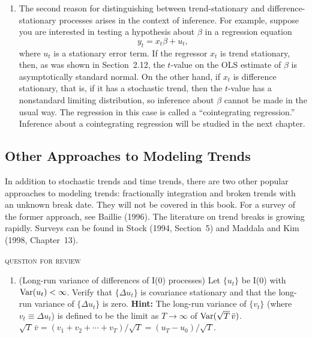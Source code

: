 \begin{enumerate}
\item The second reason for distinguishing between trend-stationary and difference-stationary processes arises in the context of inference. For example, suppose
you are interested in testing a hypothesis about $\beta$ in a regression equation
\begin{equation}
\label{eq:9.1.14}
y_t = x_t \beta + u_t,
\end{equation}
where $u_t$ is a stationary error term. If the regressor $x_t$ is trend stationary, then,
as was shown in Section~2.12, the $t$-value on the OLS estimate of $\beta$ is asymptotically standard normal. On the other hand, if $x_t$ is difference stationary, that
is, if it has a stochastic trend, then the $t$-value has a nonstandard limiting distribution, so inference about $\beta$ cannot be made in the usual way. The regression in
this case is called a ``cointegrating regression.'' Inference about a cointegrating
regression will be studied in the next chapter.
\end{enumerate}

\subsection*{Other Approaches to Modeling Trends}

In addition to stochastic trends and time trends, there are two other popular
approaches to modeling trends: fractionally integration and broken trends with
an unknown break date. They will not be covered in this book. For a survey of
the former approach, see Baillie (1996). The literature on trend breaks is growing
rapidly. Surveys can be found in Stock (1994, Section~5) and Maddala and Kim
(1998, Chapter~13).

\bigskip
\noindent\textsc{question for review} \hrulefill

\begin{enumerate}
\item (Long-run variance of differences of I(0) processes) \enspace Let $\{u_t\}$ be I(0) with
$\operatorname{Var}(u_t) < \infty$. Verify that $\{\Delta u_t\}$ is covariance stationary and that the long-run variance of $\{\Delta u_t\}$ is zero. \textbf{Hint:} The long-run variance of $\{v_t\}$ (where
$v_t \equiv \Delta u_t$) is defined to be the limit as $T \to \infty$ of $\operatorname{Var}(\sqrt{T}\,\bar{v})$.
$\sqrt{T}\,\bar{v} = (v_1 + v_2 + \cdots + v_T)/\sqrt{T} = (u_T - u_0)/\sqrt{T}$.
\end{enumerate}
